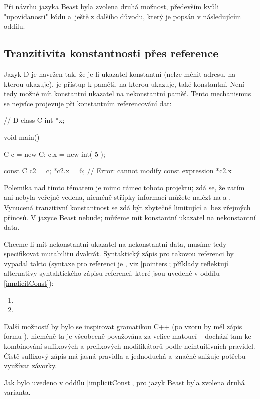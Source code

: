 Při návrhu jazyka Beast byla zvolena druhá možnost, především kvůli "upovídanosti" kódu a~ještě z dalšího důvodu, který je popsán v následujícím oddílu.

\subsection{Tranzitivita konstantnosti přes reference} \label{constPropagation} Jazyk D je navržen tak, že je-li ukazatel konstantní (nelze měnit adresu, na kterou ukazuje), je přístup k paměti, na kterou ukazuje, také konstantní. Není tedy možné mít konstantní ukazatel na nekonstantní paměť. Tento mechanismus se nejvíce projevuje při konstantním referencování dat:
\begin{dcode}
// D
class C {
	int *x;
}

void main() {
	C c = new C;
	c.x = new int( 5 );
	
	const C c2 = c;
	*c2.x = 6; // Error: cannot modify const expression *c2.x
}
\end{dcode}

Polemika nad tímto tématem je mimo rámec tohoto projektu; zdá se, že zatím ani nebyla veřejně vedena, nicméně střípky informací můžete nalézt na \cite{FullyTransitiveConst} a \cite{TransitiveConst2}. Vynucená tranzitivní konstantnost se zdá být zbytečně limitující a~bez zřejmých přínosů. V jazyce Beast nebude; můžeme mít konstantní ukazatel na nekonstantní data.

Chceme-li mít nekonstantní ukazatel na nekonstantní data, musíme tedy specifikovat mutabilitu dvakrát. Syntaktický zápis pro takovou referenci by vypadal takto (syntaxe pro referenci je , viz \autoref{pointers}; příklady reflektují alternativy syntaktického zápisu referencí, které jsou uvedené v oddílu \ref{implicitConst}):
\begin{enumerate}
	\item {}
	\item {}
\end{enumerate}

Další možností by bylo se inspirovat gramatikou C++ (po vzoru  by měl zápis formu ), nicméně ta je všeobecně považována za velice matoucí -- dochází tam ke kombinování suffixových a prefixových modifikátorů podle neintuitivních pravidel. Čistě suffixový zápis má jasná pravidla a jednoduchá a~značně snižuje potřebu využívat závorky.

Jak bylo uvedeno v oddílu \ref{implicitConst}, pro jazyk Beast byla zvolena druhá varianta.

